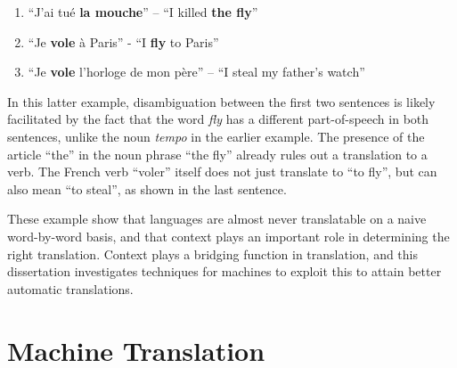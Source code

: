 \begin{enumerate}
\item ``J'ai tué \textbf{la mouche}'' -- ``I killed \textbf{the fly}''
\item ``Je \textbf{vole} à Paris'' - ``I \textbf{fly} to Paris''
\item ``Je \textbf{vole} l'horloge de mon père'' -- ``I steal my father's watch''
\end{enumerate}

In this latter example, disambiguation between the first two sentences is
likely facilitated by the fact that the word \emph{fly} has a different
part-of-speech in both sentences, unlike the noun \emph{tempo} in the earlier example.
The presence of the article ``the'' in the noun phrase ``the fly'' already
rules out a translation to a verb. The French verb ``voler'' itself does not
just translate to ``to fly'', but can also mean ``to steal'', as shown in
the last sentence. 

These example show that languages are almost never translatable on a naive
word-by-word basis, and that context plays an important role in determining the
right translation. Context plays a bridging function in translation, and this
dissertation investigates techniques for machines to exploit this to attain
better automatic translations.

\section{Machine Translation}



















